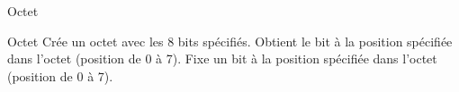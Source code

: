 \begin{tad}




    \begin{tadOperations}{Octet}
            {\tadParams{}}%
            {}
            {}%
            {}
            {}%
            {}
    \end{tadOperations}

    \begin{tadSemantiques}{Octet}
			{Crée un octet avec les 8 bits spécifiés.}%
			{Obtient le bit à la position spécifiée dans l'octet (position de 0 à 7).}
			{Fixe un bit à la position spécifiée dans l'octet (position de 0 à 7).}    
    \end{tadSemantiques}

    \begin{tadAxiomes}
    \end{tadAxiomes}

\end{tad}
